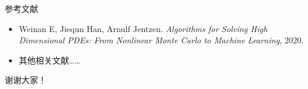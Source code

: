 \documentclass[aspectratio=169]{beamer}
\begin{document}
\begin{frame}{参考文献}
  \begin{itemize}
    \item Weinan E, Jiequn Han, Arnulf Jentzen. \emph{Algorithms for Solving High Dimensional PDEs: From Nonlinear Monte Carlo to Machine Learning}, 2020.
    \item 其他相关文献……
  \end{itemize}
\end{frame}

\begin{frame}
  \centering \Large 谢谢大家！
\end{frame}
\end{document}
